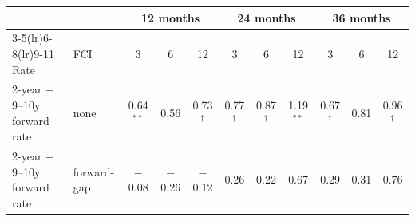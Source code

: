\begin{tabular}{llccccccccc}
\toprule
 & & \multicolumn{3}{c}{12 months} & \multicolumn{3}{c}{24 months} & \multicolumn{3}{c}{36 months}\\
\cmidrule(lr){3-5}\cmidrule(lr){6-8}\cmidrule(lr){9-11}
Rate & FCI & 3 & 6 & 12 & 3 & 6 & 12 & 3 & 6 & 12 \\
\midrule
2-year $-$ 9--10y forward rate & none & 0.64$^{**}$ & 0.56 & 0.73$^{\dagger}$ & 0.77$^{\dagger}$ & 0.87$^{\dagger}$ & 1.19$^{**}$ & 0.67$^{\dagger}$ & 0.81 & 0.96$^{\dagger}$ \\
2-year $-$ 9--10y forward rate & forward-gap & $-$0.08 & $-$0.26 & $-$0.12 & 0.26 & 0.22 & 0.67 & 0.29 & 0.31 & 0.76 \\
\bottomrule
\end{tabular}
